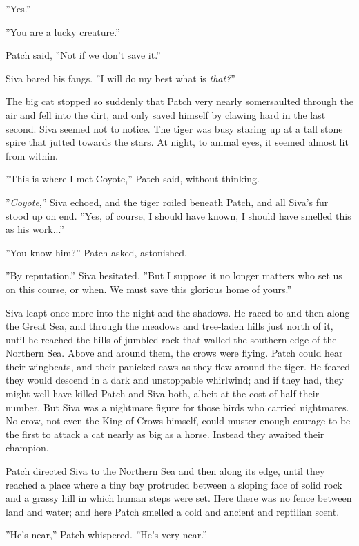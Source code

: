 \documentclass[11pt]{article}
\begin{document}
 ''Yes.''\par
 ''You are a lucky creature.''\par
 Patch said, ''Not if we don't save it.''\par
 Siva bared his fangs. ''I will do my best %
 what is {\it that?}''\par
 The big cat stopped so suddenly that Patch very nearly somersaulted through the air and fell into the dirt, and only saved himself by clawing hard in the last second. Siva seemed not to notice. The tiger was busy staring up at a tall stone spire that jutted towards the stars. At night, to animal eyes, it seemed almost lit from within.\par
 ''This is where I met Coyote,'' Patch said, without thinking.\par
 ''{\it Coyote},'' Siva echoed, and the tiger roiled beneath Patch, and all Siva's fur stood up on end. ''Yes, of course, I should have known, I should have smelled this as his work...''\par
 ''You know him?'' Patch asked, astonished.\par
 ''By reputation.'' Siva hesitated. ''But I suppose it no longer matters who set us on this course, or when. We must save this glorious home of yours.''\par
 Siva leapt once more into the night and the shadows. He raced to and then along the Great Sea, and through the meadows and tree-laden hills just north of it, until he reached the hills of jumbled rock that walled the southern edge of the Northern Sea. Above and around them, the crows were flying. Patch could hear their wingbeats, and their panicked caws as they flew around the tiger. He feared they would descend in a dark and unstoppable whirlwind; and if they had, they might well have killed Patch and Siva both, albeit at the cost of half their number. But Siva was a nightmare figure for those birds who carried nightmares. No crow, not even the King of Crows himself, could muster enough courage to be the first to attack a cat nearly as big as a horse. Instead they awaited their champion.\par
 Patch directed Siva to the Northern Sea and then along its edge, until they reached a place where a tiny bay protruded between a sloping face of solid rock and a grassy hill in which human steps were set. Here there was no fence between land and water; and here Patch smelled a cold and ancient and reptilian scent.\par
 ''He's near,'' Patch whispered. ''He's very near.''\par
\end{document}
